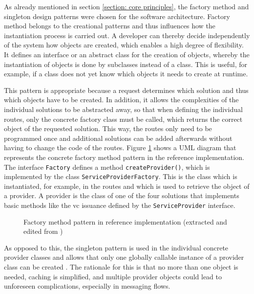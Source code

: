     As already mentioned in section \ref{section: core principles}, the factory method and singleton design patterns were chosen for the software architecture. Factory method belongs to the creational patterns and thus influences how the instantiation process is carried out. A developer can thereby decide independently of the system how objects are created, which enables a high degree of flexibility. It defines an interface or an abstract class for the creation of objects, whereby the instantiation of objects is done by subclasses instead of a class. This is useful, for example, if a class does not yet know which objects it needs to create at runtime. \cite[pp. 81, 85, 107-108]{gamma_design_1995} 
    
    This pattern is appropriate because a request determines which solution and thus which objects have to be created. In addition, it allows the complexities of the individual solutions to be abstracted away, so that when defining the individual routes, only the concrete factory class must be called, which returns the correct object of the requested solution. This way, the routes only need to be programmed once and additional solutions can be added afterwards without having to change the code of the routes. Figure \ref{figure: factory method} shows a UML diagram that represents the concrete factory method pattern in the reference implementation. The interface \texttt{Factory} defines a method \texttt{createProvider()}, which is implemented by the class \texttt{ServiceProviderFactory}. This is the class which is instantiated, for example, in the routes and which is used to retrieve the object of a provider. A provider is the class of one of the four solutions that implements basic methods like the \ac{vc} issuance defined by the \texttt{ServiceProvider} interface.
    
    \begin{figure}[ht]
	    \centering    	    \makebox[\textwidth]{}
        \caption{Factory method pattern in reference implementation (extracted and edited from \cite[p. 107]{gamma_design_1995})}
        \label{figure: factory method}
    \end{figure}
    
    As opposed to this, the singleton pattern is used in the individual concrete provider classes and allows that only one globally callable instance of a provider class can be created \cite[p. 127]{gamma_design_1995}. The rationale for this is that no more than one object is needed, caching is simplified, and multiple provider objects could lead to unforeseen complications, especially in messaging flows. 
    
